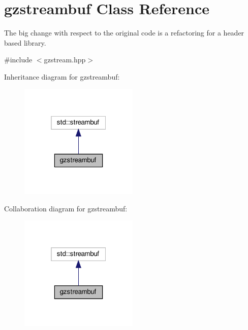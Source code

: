 \hypertarget{classgzstreambuf}{}\section{gzstreambuf Class Reference}
\label{classgzstreambuf}


The big change with respect to the original code is a refactoring for a header based library.  




{\ttfamily \#include $<$gzstream.\+hpp$>$}



Inheritance diagram for gzstreambuf\+:
\nopagebreak
\begin{figure}[H]
\begin{center}
\leavevmode
\includegraphics[width=160pt]{d1/d44/classgzstreambuf__inherit__graph}
\end{center}
\end{figure}


Collaboration diagram for gzstreambuf\+:
\nopagebreak
\begin{figure}[H]
\begin{center}
\leavevmode
\includegraphics[width=160pt]{d8/d2c/classgzstreambuf__coll__graph}
\end{center}
\end{figure}
